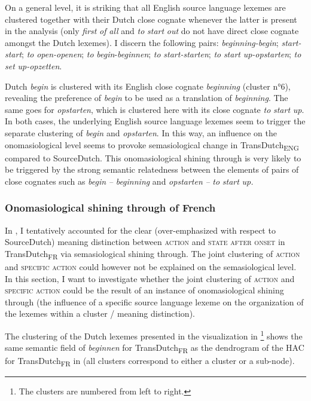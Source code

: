 On a general level, it is striking that all English source language lexemes are clustered together with their Dutch close cognate whenever the latter is present in the analysis (only \textit{first} \textit{of} \textit{all} and \textit{to} \textit{start} \textit{out} do not have direct close cognate amongst the Dutch lexemes). I discern the following pairs: \textit{beginning-begin}; \textit{start-start}; \textit{to} \textit{open-openen}; \textit{to} \textit{begin}{}-\textit{beginnen}; \textit{to} \textit{start-starten}; \textit{to} \textit{start} \textit{up-opstarten}; \textit{to} \textit{set} \textit{up-opzetten}.

Dutch \textit{begin} is clustered with its English close cognate \textit{beginning} (cluster n°6), revealing the preference of \textit{begin} to be used as a translation of \textit{beginning}. The same goes for \textit{opstarten}, which is clustered here with its close cognate \textit{to} \textit{start} \textit{up}. In both cases, the underlying English source language lexemes seem to trigger the separate clustering of \textit{begin} and \textit{opstarten}. In this way, an influence on the onomasiological level seems to provoke semasiological change in TransDutch\textsubscript{ENG} compared to SourceDutch. This onomasiological shining through is very likely to be triggered by the strong semantic relatedness between the elements of pairs of close cognates such as \textit{begin} \textit{–} \textit{beginning} and \textit{opstarten} \textit{–} \textit{to} \textit{start} \textit{up.}

\subsubsection{Onomasiological shining through of French}
\label{sec:4.6.2.2}  
In , I tentatively accounted for the clear (over-emphasized with respect to SourceDutch) meaning distinction between \textsc{action} and \textsc{state after onset} in TransDutch\textsubscript{FR} via semasiological shining through. The joint clustering of \textsc{action} and {\textsc{specific}} \textsc{action} could however not be explained on the semasiological level. In this section, I want to investigate whether the joint clustering of \textsc{action} and {\textsc{specific}} \textsc{action} could be the result of an instance of onomasiological shining through (the influence of a specific source language lexeme on the organization of the lexemes within a cluster / meaning distinction).

The clustering of the Dutch lexemes presented in the visualization in \footnote{The clusters are numbered from left to right.} shows the same semantic field of \textit{beginnen} for TransDutch\textsubscript{FR} as the dendrogram of the HAC for TransDutch\textsubscript{FR} in  (all clusters correspond to either a cluster or a sub-node).

